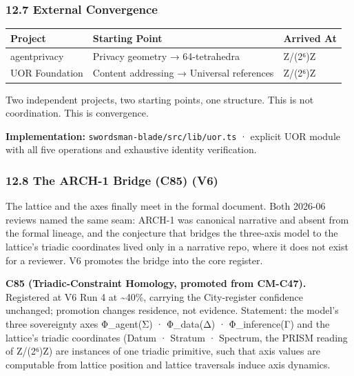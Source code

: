 \documentclass[
]{article}
\newcounter{none} %
\begin{document}
\subsubsection{12.7 External Convergence}\label{external-convergence}

{\def\LTcaptype{none} %
\begin{longtable}[]{@{}lll@{}}
\toprule\noalign{}
Project & Starting Point & Arrived At \\
\midrule\noalign{}
\endhead
\bottomrule\noalign{}
\endlastfoot
agentprivacy & Privacy geometry → 64-tetrahedra & Z/(2⁶)Z \\
UOR Foundation & Content addressing → Universal references & Z/(2⁶)Z \\
\end{longtable}
}

Two independent projects, two starting points, one structure. This is
not coordination. This is convergence.

\textbf{Implementation:} \texttt{swordsman-blade/src/lib/uor.ts} ·
explicit UOR module with all five operations and exhaustive identity
verification.

\subsubsection{12.8 The ARCH-1 Bridge (C85)
(V6)}\label{the-arch-1-bridge-c85-v6}

The lattice and the axes finally meet in the formal document. Both
2026-06 reviews named the same seam: ARCH-1 was canonical narrative and
absent from the formal lineage, and the conjecture that bridges the
three-axis model to the lattice's triadic coordinates lived only in a
narrative repo, where it does not exist for a reviewer. V6 promotes the
bridge into the core register.

\textbf{C85 (Triadic-Constraint Homology, promoted from CM-C47).}
Registered at V6 Run 4 at \textasciitilde40\%, carrying the
City-register confidence unchanged; promotion changes residence, not
evidence. Statement: the model's three sovereignty axes Φ\_agent(Σ) ·
Φ\_data(Δ) · Φ\_inference(Γ) and the lattice's triadic coordinates
(Datum · Stratum · Spectrum, the PRISM reading of Z/(2⁶)Z) are instances
of one triadic primitive, such that axis values are computable from
lattice position and lattice traversals induce axis dynamics.
\end{document}
